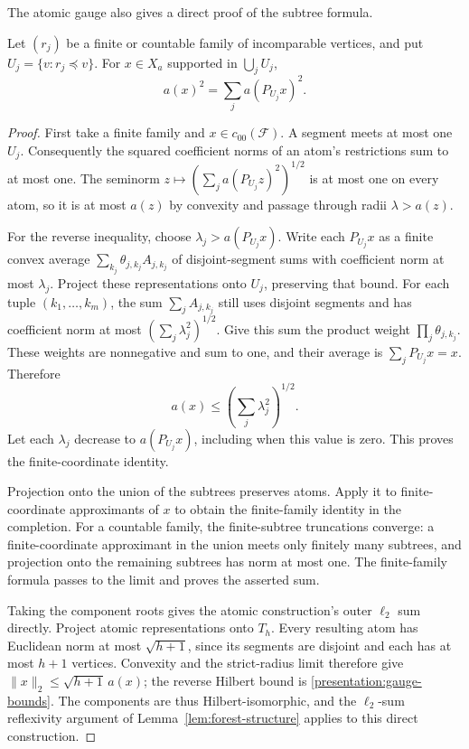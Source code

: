 The atomic gauge also gives a direct proof of the subtree formula.

\begin{proposition}\label{presentation:subtrees}
Let $(r_j)$ be a finite or countable family of incomparable vertices,
and put $U_j=\{v:r_j\preceq v\}$. For $x\in X_a$ supported in
$\bigcup_jU_j$,
\[
 a(x)^2=\sum_j a(P_{U_j}x)^2.
\]
\end{proposition}

\begin{proof}
First take a finite family and $x\in c_{00}(\mathcal F)$. A segment
meets at most one $U_j$. Consequently the squared coefficient norms
of an atom's restrictions sum to at most one. The seminorm
$z\mapsto(\sum_j a(P_{U_j}z)^2)^{1/2}$ is at most one on every atom,
so it is at most $a(z)$ by convexity and passage through radii
$\lambda>a(z)$.

For the reverse inequality, choose $\lambda_j>a(P_{U_j}x)$.
Write each $P_{U_j}x$ as a finite convex average
$\sum_{k_j}\theta_{j,k_j}A_{j,k_j}$ of disjoint-segment sums with
coefficient norm at most $\lambda_j$. Project these representations
onto $U_j$, preserving that bound. For each tuple $(k_1,\ldots,k_m)$,
the sum $\sum_j A_{j,k_j}$ still uses disjoint segments and has
coefficient norm at most $(\sum_j\lambda_j^2)^{1/2}$. Give this sum
the product weight $\prod_j\theta_{j,k_j}$. These weights are
nonnegative and sum to one, and their average is
$\sum_jP_{U_j}x=x$. Therefore
\[
 a(x)\le\left(\sum_j\lambda_j^2\right)^{1/2}.
\]
Let each $\lambda_j$ decrease to $a(P_{U_j}x)$, including when this
value is zero. This proves the finite-coordinate identity.

Projection onto the union of the subtrees preserves atoms. Apply it
to finite-coordinate approximants of $x$ to obtain the finite-family
identity in the completion. For a countable family, the finite-subtree
truncations converge: a finite-coordinate approximant in the union
meets only finitely many subtrees, and projection onto the remaining
subtrees has norm at most one. The finite-family formula passes to
the limit and proves the asserted sum.

Taking the component roots gives the atomic construction's outer
$\ell_2$ sum directly. Project atomic representations onto $T_h$.
Every resulting atom has Euclidean norm at most $\sqrt{h+1}$, since
its segments are disjoint and each has at most $h+1$ vertices. Convexity and the strict-radius limit therefore give
$\|x\|_2\le\sqrt{h+1}\,a(x)$; the reverse Hilbert bound is
\eqref{presentation:gauge-bounds}. The components are thus
Hilbert-isomorphic, and the $\ell_2$-sum reflexivity argument of
Lemma~\ref{lem:forest-structure} applies to this direct construction.
\end{proof}

